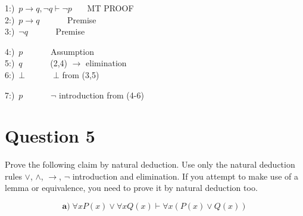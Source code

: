 \documentclass[a4paper,12pt]{article}
\newcommand\tab[1][1cm]{\hspace*{#1}}
\begin{document}
\begin{tcolorbox}
\begin{center}
\vspace{2cm}
1:)\, $ p \rightarrow q , \neg q  \vdash \neg p $\,\,\,\,\,\,\,\,\, MT PROOF\\
2:)\, $ p \rightarrow q  $\,\,\,\,\,\,\,\,\,\,\,\,\,\,\,\,\,\, Premise\\
3:)\, $ \neg q  $\,\,\,\,\,\,\,\,\,\,\,\,\,\,\,\,\,\, Premise\\
\begin{tcolorbox}
\begin{center}
    4:)\, $ p $\,\,\,\,\,\,\,\,\,\,\,\,\,\,\,\,\,\, Assumption\\
    5:)\, $  q  $\,\,\,\,\,\,\,\,\,\,\,\,\,\,\,\,\,\, (2,4) $\rightarrow $ elimination\\
    6:)\, $ \bot   $\,\,\,\,\,\,\,\,\,\,\,\,\,\,\,\,\,\, $\bot$ from (3,5)\\
\end{center}
\end{tcolorbox}
7:)\, $p   $\,\,\,\,\,\,\,\,\,\,\,\,\,\,\,\,\,\, $\neg $ introduction from (4-6)\\
\end{center}

\end{tcolorbox}
\newpage
\section*{Question 5 \hfill {}}
\tab Prove the following claim by natural deduction. Use only the natural deduction rules $\vee$, $\wedge$, $\rightarrow$, $\neg$ introduction and elimination. If you attempt to make use of a lemma or equivalence, you need to prove it by natural deduction too.


\begin{equation*}
    \textbf{a)} \; \forall x P(x) \vee \forall x Q(x) \vdash \forall x (P(x) \vee Q(x)) 
\end{equation*}
\end{document}

